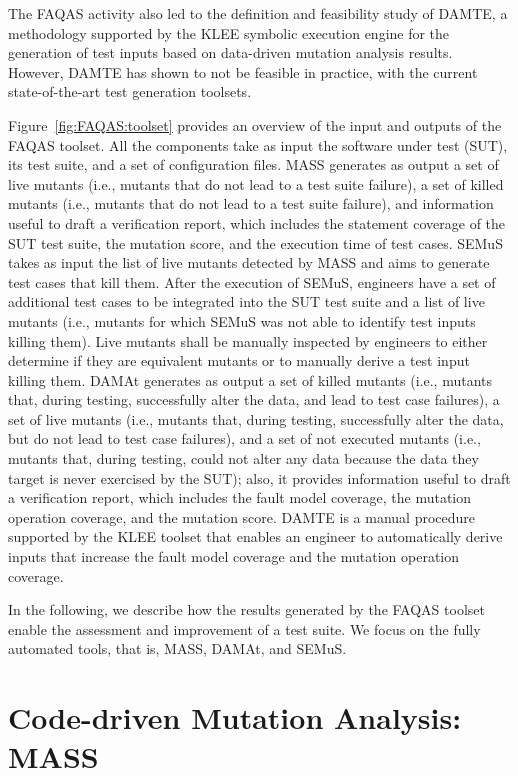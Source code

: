 The FAQAS activity also led to the definition and feasibility study of DAMTE, a methodology supported by the KLEE symbolic execution engine for the generation of test inputs based on data-driven mutation analysis results. However, DAMTE has shown to not be feasible in practice, with the current state-of-the-art test generation toolsets.

Figure~\ref{fig:FAQAS:toolset} provides an overview of the input and outputs of the FAQAS toolset. All the components take as input the software under test (SUT), its test suite, and a set of configuration files. 
MASS generates as output a set of live mutants (i.e., mutants that do not lead to a test suite failure), a set of killed mutants (i.e., mutants that do not lead to a test suite failure), and information useful to draft a verification report, which includes the statement coverage of the SUT test suite, the mutation score, and the execution time of test cases.
SEMuS takes as input the list of live mutants detected by MASS and aims to generate test cases that kill them. After the
 execution of SEMuS, engineers have a set of additional test cases to be integrated into the SUT test suite and a list of live mutants (i.e., mutants for which SEMuS was not able to identify test inputs killing them). Live mutants shall be manually inspected by engineers to either determine if they are equivalent mutants or to manually derive a test input killing them.
 DAMAt generates as output a set of killed mutants (i.e., mutants that, during testing, successfully alter the data, and lead to test case failures), a set of live mutants (i.e., mutants that, during testing, successfully alter the data, but do not lead to test case failures), and a set of not executed mutants (i.e., mutants that, during testing, could not alter any data because the data they target is never exercised by the SUT); also, it provides information useful to draft a verification report, which includes the fault model coverage, the mutation operation coverage, and the mutation score.
 DAMTE is a manual procedure supported by the KLEE toolset that enables an engineer to automatically derive inputs that increase the fault model coverage and the mutation operation coverage.

In the following, we describe how the results generated by the FAQAS toolset enable the assessment and improvement of a test suite.
We focus on the fully automated tools, that is, MASS, DAMAt, and SEMuS.


\section{Code-driven Mutation Analysis: MASS}
\label{sec:meth:mass} 
 
